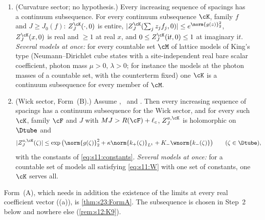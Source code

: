 \begin{lemma}\label{lem:s12:LIM0}
\begin{enumerate}[label=\textup{(\alph*)},leftmargin=*,nosep]
\item \textup{(Curvature sector; no hypothesis.)} Every increasing sequence of spacings has a continuum subsequence. For every continuum subsequence $\cK$, family $f$ and $J\ge J_0(f)$: $Z^{\cK}_J(\cdot,0)$ is entire, $|Z^{\cK}_J(\sum_jz_jf_j,0)|\le e^{\norm{g(z)}_2^2}$, $Z^{\cK}_J(x,0)$ is real and $\ge1$ at real $x$, and $0\le Z^{\cK}_J(\mathrm it,0)\le1$ at imaginary $\mathrm it$. \emph{Several models at once:} for every countable set $\cM$ of lattice models of King's type (Neumann--Dirichlet cube states with a site-independent real bare scalar coefficient, photon mass $\mu>0$, $\lambda>0$; for instance the models at the photon masses of a countable set, with the counterterm fixed) one $\cK$ is a continuum subsequence for every member of $\cM$.
\item \textup{(Wick sector, Form~(B).)} Assume \Tthree, \Bcell\ and \SCH. Then every increasing sequence of spacings has a continuum subsequence for the Wick sector, and for every such $\cK$, family $\cF$ and $J$ with $MJ>R(\cF)+\ell_c$, $Z^{a,\cK}_J$ is holomorphic on $\Dtube$ and
\begin{equation}\label{eq:s12:Winf}
|Z^{a,\cK}_J(\zeta)|\le\exp\big(\norm{g(\zeta)}_2^2+\kappa\norm{k_+(\zeta)}_{L^1}+K_-\wnorm{k_-(\zeta)}\big)\qquad(\zeta\in\Dtube),
\end{equation}
with the constants of \eqref{eq:s11:constants}. \emph{Several models at once:} for a countable set of models all satisfying \eqref{eq:s11:W} with one set of constants, one $\cK$ serves all.
\end{enumerate}
\end{lemma}

Form~(A), which needs in addition the existence of the limits at every real coefficient vector (\Wtwo(a)), is \cref{thm:s23:FormA}. The subsequence is chosen in Step~2 below and nowhere else (\cref{rem:s12:K9}).


